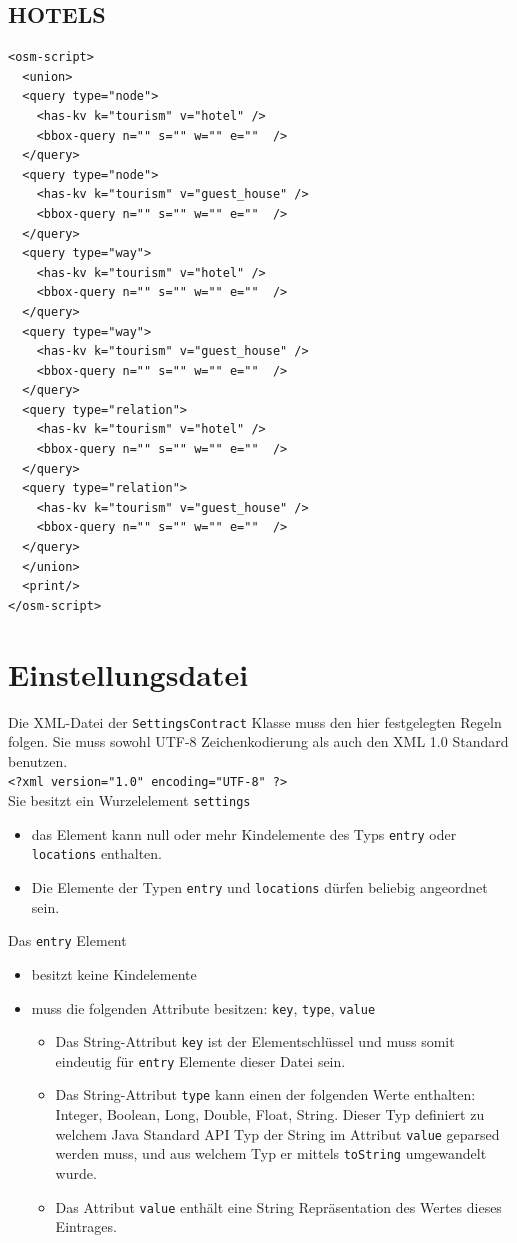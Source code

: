 \documentclass[10pt]{scrreprt}
\begin{document}
\subsection*{HOTELS}
\begin{lstlisting}
<osm-script>
  <union>
  <query type="node">
    <has-kv k="tourism" v="hotel" />
    <bbox-query n="" s="" w="" e=""  />
  </query>
  <query type="node">
    <has-kv k="tourism" v="guest_house" />
    <bbox-query n="" s="" w="" e=""  />
  </query>
  <query type="way">
    <has-kv k="tourism" v="hotel" />
    <bbox-query n="" s="" w="" e=""  />
  </query>
  <query type="way">
    <has-kv k="tourism" v="guest_house" />
    <bbox-query n="" s="" w="" e=""  />
  </query>
  <query type="relation">
    <has-kv k="tourism" v="hotel" />
    <bbox-query n="" s="" w="" e=""  />
  </query>
  <query type="relation">
    <has-kv k="tourism" v="guest_house" />
    <bbox-query n="" s="" w="" e=""  />
  </query>
  </union>
  <print/>
</osm-script>
\end{lstlisting}

\newpage

\section{Einstellungsdatei}
Die XML-Datei der \texttt{SettingsContract} Klasse muss den hier festgelegten Regeln folgen.
Sie muss sowohl UTF-8 Zeichenkodierung als auch den XML 1.0 Standard benutzen. \\
\texttt{<?xml version="{}1.0"{} encoding="{}UTF-8"{} ?>} \\
Sie besitzt ein Wurzelelement \texttt{settings}
\begin{itemize}
 \item das Element kann null oder mehr Kindelemente des Typs \texttt{entry} oder \texttt{locations} enthalten.
 \item Die Elemente der Typen \texttt{entry} und \texttt{locations} dürfen beliebig angeordnet sein.
\end{itemize}

Das \texttt{entry} Element
\begin{itemize}
 \item besitzt keine Kindelemente
 \item muss die folgenden Attribute besitzen: \texttt{key}, \texttt{type}, \texttt{value}
 \begin{itemize}
 \item Das String-Attribut \texttt{key} ist der Elementschlüssel und muss somit eindeutig für \texttt{entry} Elemente dieser Datei sein.
 \item Das String-Attribut \texttt{type} kann einen der folgenden Werte enthalten: Integer, Boolean, Long, Double, Float, String.
  Dieser Typ definiert zu welchem Java Standard API Typ der String im Attribut \texttt{value} geparsed werden muss, und aus welchem Typ er mittels \texttt{toString} umgewandelt wurde.
   \item Das Attribut \texttt{value} enthält eine String Repräsentation des Wertes dieses Eintrages.
 \end{itemize}
\end{itemize}
\end{document}

